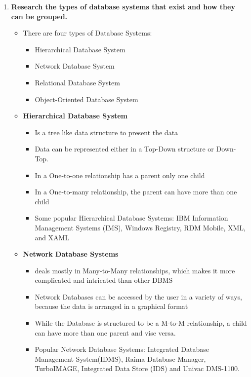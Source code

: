 \documentclass{article}
\begin{document}
\begin{enumerate}
\item \textbf{Research the types of database systems that exist and how they can be grouped.}
\begin{itemize}
	\item There are four types of Database Systems: \cite{database_systems}
	\begin{itemize}
		\item Hierarchical Database System
		\item Network Database System
		\item Relational Database System
		\item Object-Oriented Database System
	\end{itemize}
	
	\item \textbf{Hierarchical Database System}\cite{database_systems}

	\begin{itemize}
		\item Is a tree like data structure to present the data
		\item Data can be represented either in a Top-Down structure or Down-Top. 
		\item In a One-to-one relationship has a parent only one child
		\item In a One-to-many relationship, the parent can have more than one child
		\item Some popular Hierarchical Database Systems: IBM Information Management Systems (IMS), Windows Registry, RDM Mobile, XML, and XAML
	\end{itemize}


		\item \textbf{Network Database Systems}
	\begin{itemize}
		\item deals mostly in Many-to-Many relationships, which makes it more complicated and intricated than other DBMS
		\item Network Databases can be accessed by the user in a variety of ways, because the data is arranged in a graphical format
		\item While the Database is structured to be a M-to-M relationship, a child can have more than one parent and vise versa. 
		\item Popular Network Database Systems: Integrated Database Management System(IDMS), Raima Database Manager, TurboIMAGE, Integrated Data Store (IDS) and Univac DMS-1100.
	\end{itemize}
	
	
\end{itemize}
\end{enumerate}
\end{document}
